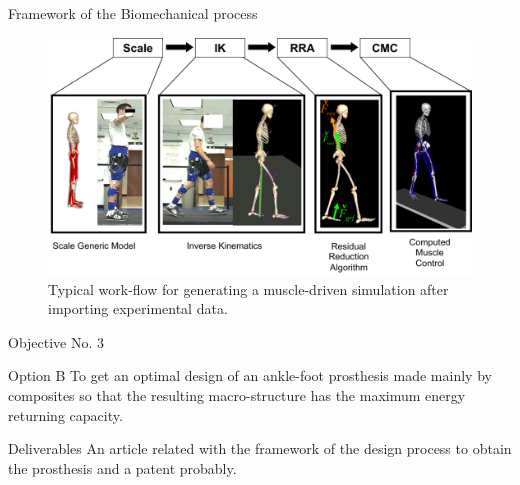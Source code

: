 \documentclass[10pt]{beamer}
\begin{document}
\begin{frame}{Framework of the Biomechanical process}
\begin{figure}[H]
\begin{centering}
\includegraphics[scale=0.5]{opensim_process.png}
\par\end{centering}

\caption{\label{fig:N=1} Typical work-flow for generating a muscle-driven simulation after importing experimental data.}

\end{figure}
\end{frame}

\begin{frame}{Objective No. 3}
	\begin{block}{Option B}
	To get an optimal design of an ankle-foot prosthesis made mainly by composites so that the resulting macro-structure has the maximum energy returning capacity. 
	\end{block}
	\begin{exampleblock}{Deliverables}
	An article related with the framework of the design process to obtain the prosthesis and a patent probably.
	\end{exampleblock}
\end{frame}
\end{document}
